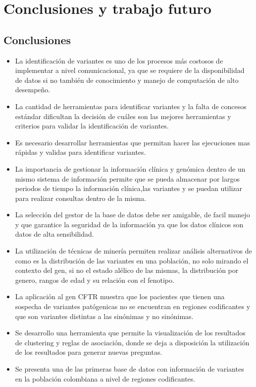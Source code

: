 \chapter{Conclusiones y trabajo futuro}

\section{Conclusiones}

\begin{itemize}
	\item La identificación de variantes es uno de los procesos más costosos de implementar a nivel comunicacional, ya que se requiere de la disponibilidad de datos si no también de conocimiento y manejo de computación de alto desempeño.
	
	\item La cantidad de herramientas para identificar variantes y la falta de concesos estándar dificultan la decisión de cuáles son las mejores herramientas y criterios para validar la identificación de variantes.
	
	\item Es necesario desarrollar herramientas que permitan hacer las ejecuciones mas rápidas y validas para identificar variantes. 
	
	\item La importancia de gestionar la información clínica y genómica dentro de un mismo sistema de información permite que se pueda almacenar por largos periodos de tiempo la información clínica,las variantes y se puedan utilizar para realizar consultas dentro de la misma. 
	
	\item La selección del gestor de la base de datos debe ser amigable, de facil manejo y que garantice la seguridad de la información ya que los datos clínicos son datos de alta sensibilidad.
	
	\item La utilización de técnicas de minería permiten realizar análisis alternativos de como es la distribución de las variantes en una población, no solo mirando el contexto del gen, si no el estado alélico de las mismas, la distribución por genero, rangos de edad y su relación con el fenotipo.
	
	\item La aplicación al gen CFTR muestra que los pacientes que tienen una sospecha de variantes patógenicas no se encuentran en regiones codificantes y que son variantes distintas a las sinónimas y no sinónimas.
	
	\item Se desarrollo una herramienta que permite la visualización de los resultados de clustering y reglas de asociación, donde se deja a disposición la utilización de los resultados para generar nuevas preguntas.
	
	\item Se presenta una de las primeras base de datos con información de variantes en la población colombiana a nivel de regiones codificantes.
	 
\end{itemize}

